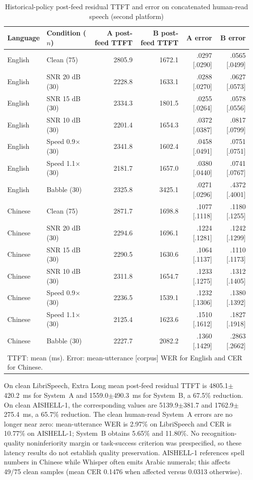 \documentclass[conference]{IEEEtran}
\begin{document}
\begin{table}[!t]
\caption{Historical-policy post-feed residual TTFT and error on concatenated human-read speech (second platform)}\label{tab:real}
\centering
\scriptsize
\begin{tabular}{@{}llrrrr@{}}
\toprule
Language & Condition ($n$) & A post-feed TTFT & B post-feed TTFT & A error & B error \\
\midrule
English & Clean (75) & 2805.9 & 1672.1 & .0297 [.0290] & .0565 [.0499] \\
English & SNR 20 dB (30) & 2228.8 & 1633.1 & .0288 [.0270] & .0627 [.0573] \\
English & SNR 15 dB (30) & 2334.3 & 1801.5 & .0255 [.0264] & .0578 [.0556] \\
English & SNR 10 dB (30) & 2201.4 & 1654.3 & .0372 [.0387] & .0817 [.0799] \\
English & Speed 0.9$\times$ (30) & 2341.8 & 1602.4 & .0458 [.0491] & .0751 [.0751] \\
English & Speed 1.1$\times$ (30) & 2181.7 & 1657.0 & .0380 [.0440] & .0741 [.0767] \\
English & Babble (30) & 2325.8 & 3425.1 & .0271 [.0296] & .4372 [.4001] \\
\midrule
Chinese & Clean (75) & 2871.7 & 1698.8 & .1077 [.1118] & .1180 [.1255] \\
Chinese & SNR 20 dB (30) & 2294.6 & 1696.1 & .1224 [.1281] & .1242 [.1299] \\
Chinese & SNR 15 dB (30) & 2290.5 & 1630.6 & .1064 [.1137] & .1110 [.1173] \\
Chinese & SNR 10 dB (30) & 2311.8 & 1654.7 & .1233 [.1275] & .1312 [.1405] \\
Chinese & Speed 0.9$\times$ (30) & 2236.5 & 1539.1 & .1232 [.1306] & .1380 [.1392] \\
Chinese & Speed 1.1$\times$ (30) & 2125.4 & 1623.6 & .1510 [.1612] & .1827 [.1918] \\
Chinese & Babble (30) & 2227.7 & 2082.2 & .1360 [.1429] & .2863 [.2662] \\
\bottomrule
\multicolumn{6}{l}{\footnotesize TTFT: mean (ms). Error: mean-utterance [corpus] WER for English and CER for Chinese.}
\end{tabular}
\end{table}

On clean LibriSpeech, Extra Long mean post-feed residual TTFT is 4805.1$\pm$420.2~ms for System~A and 1559.0$\pm$490.3~ms for System~B, a 67.5\% reduction. On clean AISHELL-1, the corresponding values are 5139.9$\pm$381.7 and 1762.9$\pm$275.4~ms, a 65.7\% reduction. The clean human-read System~A errors are no longer near zero: mean-utterance WER is 2.97\% on LibriSpeech and CER is 10.77\% on AISHELL-1; System~B obtains 5.65\% and 11.80\%. No recognition-quality noninferiority margin or task-success criterion was prespecified, so these latency results do not establish quality preservation. AISHELL-1 references spell numbers in Chinese while Whisper often emits Arabic numerals; this affects 49/75 clean samples (mean CER 0.1476 when affected versus 0.0313 otherwise).
\end{document}
